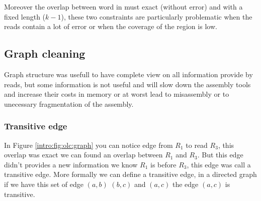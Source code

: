 \documentclass[./main.tex]{subfiles}
\begin{document}
Moreover the overlap between word in \DBG must exact (without error) and with a fixed length ($k - 1$), these two constraints are particularly problematic when the reads contain a lot of error or when the coverage of the region is low.






\subsection{Graph cleaning}

Graph structure was usefull to have complete view on all information provide by reads, but some information is not useful and will slow down the assembly tools and increase their costs in memory or at worst lead to misassembly or to unecessary fragmentation of the assembly.

\subsubsection{Transitive edge}

In Figure \ref{intro:fig:olc:graph} you can notice edge from $R_1$ to read $R_3$, this overlap was exact we can found an overlap between $R_1$ and $R_3$. But this edge didn't provides a new information we know $R_1$ is before $R_3$, this edge was call a transitive edge. More formally we can define a transitive edge, in a directed graph if we have this set of edge $(a, b)$ $(b, c)$ and $(a, c)$ the edge $(a, c)$ is transitive.
\end{document}
